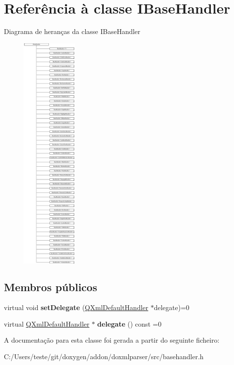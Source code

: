 \hypertarget{class_i_base_handler}{\section{Referência à classe I\-Base\-Handler}
\label{class_i_base_handler}
}
Diagrama de heranças da classe I\-Base\-Handler\begin{figure}[H]
\begin{center}
\leavevmode
\includegraphics[height=12.000000cm]{class_i_base_handler}
\end{center}
\end{figure}
\subsection*{Membros públicos}
\begin{DoxyCompactItemize}
\item 
\hypertarget{class_i_base_handler_a1bb5a3da0d9de444ef729b6c26958206}{virtual void {\bfseries set\-Delegate} (\hyperlink{class_q_xml_default_handler}{Q\-Xml\-Default\-Handler} $\ast$delegate)=0}\label{class_i_base_handler_a1bb5a3da0d9de444ef729b6c26958206}

\item 
\hypertarget{class_i_base_handler_a643c8e968262a1a9e032e7a5fead1a52}{virtual \hyperlink{class_q_xml_default_handler}{Q\-Xml\-Default\-Handler} $\ast$ {\bfseries delegate} () const =0}\label{class_i_base_handler_a643c8e968262a1a9e032e7a5fead1a52}

\end{DoxyCompactItemize}


A documentação para esta classe foi gerada a partir do seguinte ficheiro\-:\begin{DoxyCompactItemize}
\item 
C\-:/\-Users/teste/git/doxygen/addon/doxmlparser/src/basehandler.\-h\end{DoxyCompactItemize}
